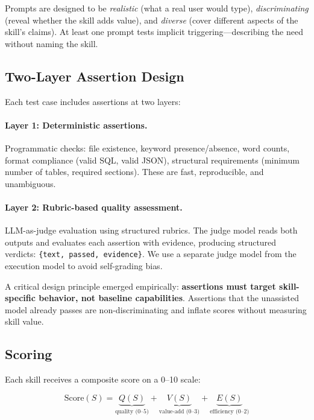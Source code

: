 \documentclass[11pt,a4paper]{article}
\begin{document}
Prompts are designed to be \emph{realistic} (what a real user would type), \emph{discriminating} (reveal whether the skill adds value), and \emph{diverse} (cover different aspects of the skill's claims). At least one prompt tests implicit triggering---describing the need without naming the skill.

\subsection{Two-Layer Assertion Design}
\label{sec:assertions}

Each test case includes assertions at two layers:

\paragraph{Layer 1: Deterministic assertions.}
Programmatic checks: file existence, keyword presence/absence, word counts, format compliance (valid SQL, valid JSON), structural requirements (minimum number of tables, required sections). These are fast, reproducible, and unambiguous.

\paragraph{Layer 2: Rubric-based quality assessment.}
LLM-as-judge evaluation using structured rubrics. The judge model reads both outputs and evaluates each assertion with evidence, producing structured verdicts: \texttt{\{text, passed, evidence\}}. We use a separate judge model from the execution model to avoid self-grading bias.

A critical design principle emerged empirically: \textbf{assertions must target skill-specific behavior, not baseline capabilities}. Assertions that the unassisted model already passes are non-discriminating and inflate scores without measuring skill value.

\subsection{Scoring}
\label{sec:scoring}

Each skill receives a composite score on a 0--10 scale:

\begin{equation}
\text{Score}(S) = \underbrace{Q(S)}_{\text{quality (0--5)}} + \underbrace{V(S)}_{\text{value-add (0--3)}} + \underbrace{E(S)}_{\text{efficiency (0--2)}}
\label{eq:score}
\end{equation}
\end{document}
